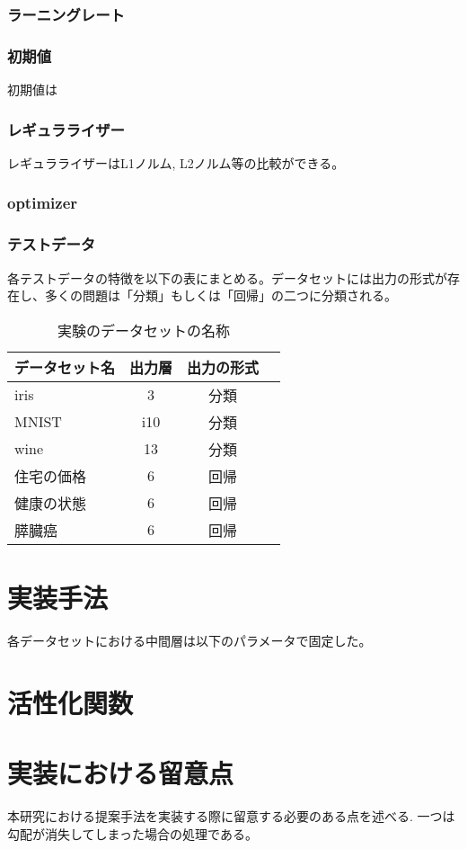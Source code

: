 \subsubsection{ラーニングレート}

\subsubsection{初期値}
初期値は
\subsubsection{レギュラライザー}
レギュラライザーはL1ノルム, L2ノルム等の比較ができる。
\subsubsection{optimizer}
\subsubsection{テストデータ}
各テストデータの特徴を以下の表にまとめる。データセットには出力の形式が存在し、多くの問題は「分類」もしくは「回帰」の二つに分類される。


\begin{table}[htbp]
    \begin{center}
        \caption{実験のデータセットの名称}
        \begin{tabular}{l*{2}{c}r}
        データセット名      & 出力層 & 出力の形式 \\
        \hline
        iris            & 3  & 分類 \\
        MNIST               & i10 & 分類  \\
        wine        & 13 & 分類 \\
        住宅の価格           & 6 & 回帰 \\
        健康の状態           & 6 & 回帰 \\
        膵臓癌           & 6 & 回帰 \\
        \end{tabular}
    \end{center}
\end{table}



\section{実装手法}

各データセットにおける中間層は以下のパラメータで固定した。



\section{活性化関数}



\section{実装における留意点}
本研究における提案手法を実装する際に留意する必要のある点を述べる.
一つは勾配が消失してしまった場合の処理である。

\section{}

